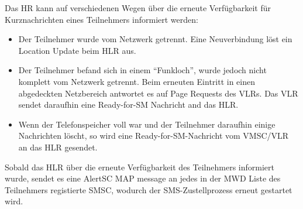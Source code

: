 \documentclass[german,12pt,a4paper]{article}
\begin{document}
Das HR kann auf verschiedenen Wegen über die erneute Verfügbarkeit für Kurznachrichten eines Teilnehmers 
informiert werden:
\begin{itemize}
    \item Der Teilnehmer wurde vom Netzwerk getrennt. Eine Neuverbindung löst ein Location Update beim 
    HLR aus.
    \item Der Teilnehmer befand sich in einem ``Funkloch'', wurde jedoch nicht komplett vom Netzwerk
    getrennt. Beim erneuten Eintritt in einen abgedeckten Netzbereich antwortet es auf Page Requests
    des VLRs. Das VLR sendet daraufhin eine Ready-for-SM Nachricht and das HLR.
    \item Wenn der Telefonspeicher voll war und der Teilnehmer daraufhin einige Nachrichten löscht, so
    wird eine Ready-for-SM-Nachricht vom VMSC/VLR an das HLR gesendet.
\end{itemize}

Sobald das HLR über die erneute Verfügbarkeit des Teilnehmers informiert wurde, sendet es eine AlertSC 
MAP message an jedes in der MWD Liste des Teilnehmers registierte SMSC, wodurch der SMS-Zustellprozess
erneut gestartet wird.

\end{document}
